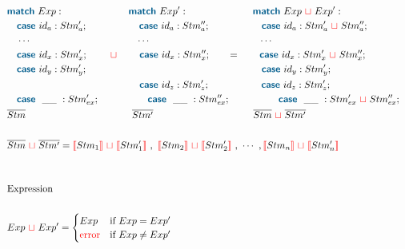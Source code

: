 \documentclass{thesis}
\newcommand{\mblue}[1]{\textbf{\textsf{\color{MidnightBlue}#1}}}
\newcommand{\nl}[1]{{\color{red}{\llbracket}}#1{\color{red}{\rrbracket}}} %
\newcommand{\mg}{~{\color{red}{\sqcup}}~} %
\begin{document}
\begin{align*}
  \\
  \\
  & \mblue{match}~Exp: ~~~~~~~~~~~~~~~~~~~~\mblue{match}~Exp': ~~~~~~~~~~~~~~~~~~~~\mblue{match}~Exp \mg Exp':\\
  & ~~~\mblue{case}~id_a : Stm'_a; ~~~~~~~~~~~~~~~~\mblue{case}~id_a : Stm''_a; ~~~~~~~~~~~~~~~~\mblue{case}~id_a : Stm'_a \mg Stm''_a;\\
  & ~~~\cdots ~~~~~~~~~~~~~~~~~~~~~~~~~~~~~~~~~\cdots ~~~~~~~~~~~~~~~~~~~~~~~~~~~~~~~~~~\cdots\\
  & ~~~\mblue{case}~id_x : Stm'_x; ~~~~~~\mg~~~~~~\mblue{case}~id_x : Stm''_x; ~~~~~~=~~~~~~\mblue{case}~id_x : Stm'_x \mg Stm''_x;\\
  & ~~~\mblue{case}~id_y : Stm'_y; ~~~~~~~~~~~~~~~~~~~~~~~~~~~~~~~~~~~~~~~~~~~~~~~~~~~~~~\mblue{case}~id_y : Stm'_y; \\
  & ~~~~~~~~~~~~~~~~~~~~~~~~~~~~~~~~~~~~~~~~~\mblue{case}~id_z : Stm'_z;~~~~~~~~~~~~~~~~\mblue{case}~id_z : Stm'_z;\\
  & ~~~\mblue{case}~~\_\_ ~: Stm'_{ex}; ~~~~~~~~~~~~~~~\mblue{case}~~\_\_ ~: Stm''_{ex}; ~~~~~~~~~~~~~~~\mblue{case}~~\_\_ ~:Stm'_{ex} \mg Stm''_{ex};\\
  & \overline{Stm} ~~~~~~~~~~~~~~~~~~~~~~~~~~~~~~~~~ \overline{Stm'} ~~~~~~~~~~~~~~~~~~~~~~~~~~~~~~~ \overline{Stm} \mg \overline{Stm'}\\
  \\
  & \overline{Stm} \mg \overline{Stm'} = \nl{Stm_1} \mg \nl{Stm_1'}~,~\nl{Stm_2} \mg \nl{Stm_2'}~,~\cdots~,\nl{Stm_n} \mg \nl{Stm'_n}\\
  \\
  \\
  & \text{Expression}\\
  \\
  & Exp \mg Exp' =
  \begin{cases}
    Exp & \text{if}~ Exp = Exp'\\
    \text{\color{red}{error}} & \text{if}~ Exp \neq Exp'
  \end{cases}\\
\end{align*}
\end{document}
